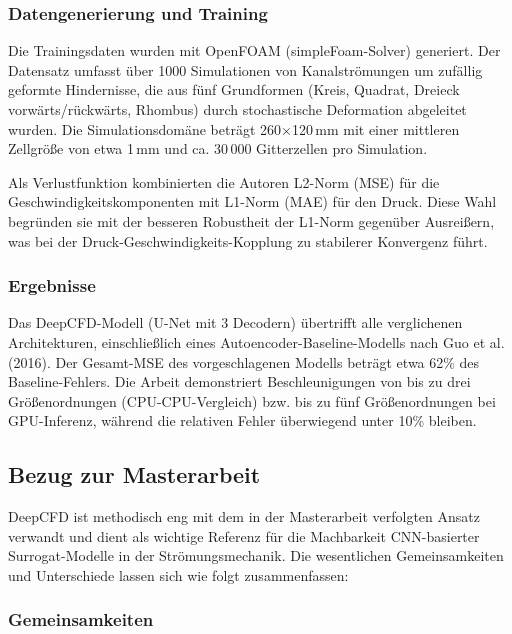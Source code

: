 \documentclass[a4paper,12pt]{article}
\begin{document}
\subsubsection*{Datengenerierung und Training}

Die Trainingsdaten wurden mit OpenFOAM (simpleFoam-Solver) generiert. Der Datensatz umfasst über 1000 Simulationen von Kanalströmungen um zufällig geformte Hindernisse, die aus fünf Grundformen (Kreis, Quadrat, Dreieck vorwärts/rückwärts, Rhombus) durch stochastische Deformation abgeleitet wurden. Die Simulationsdomäne beträgt 260$\times$120\,mm mit einer mittleren Zellgröße von etwa 1\,mm und ca. 30\,000 Gitterzellen pro Simulation.

Als Verlustfunktion kombinierten die Autoren L2-Norm (MSE) für die Geschwindigkeitskomponenten mit L1-Norm (MAE) für den Druck. Diese Wahl begründen sie mit der besseren Robustheit der L1-Norm gegenüber Ausreißern, was bei der Druck-Geschwindigkeits-Kopplung zu stabilerer Konvergenz führt.

\subsubsection*{Ergebnisse}

Das DeepCFD-Modell (U-Net mit 3 Decodern) übertrifft alle verglichenen Architekturen, einschließlich eines Autoencoder-Baseline-Modells nach Guo et al. (2016). Der Gesamt-MSE des vorgeschlagenen Modells beträgt etwa 62\% des Baseline-Fehlers. Die Arbeit demonstriert Beschleunigungen von bis zu drei Größenordnungen (CPU-CPU-Vergleich) bzw. bis zu fünf Größenordnungen bei GPU-Inferenz, während die relativen Fehler überwiegend unter 10\% bleiben.

\subsection*{Bezug zur Masterarbeit}

DeepCFD ist methodisch eng mit dem in der Masterarbeit verfolgten Ansatz verwandt und dient als wichtige Referenz für die Machbarkeit CNN-basierter Surrogat-Modelle in der Strömungsmechanik. Die wesentlichen Gemeinsamkeiten und Unterschiede lassen sich wie folgt zusammenfassen:

\subsubsection*{Gemeinsamkeiten}
\end{document}
